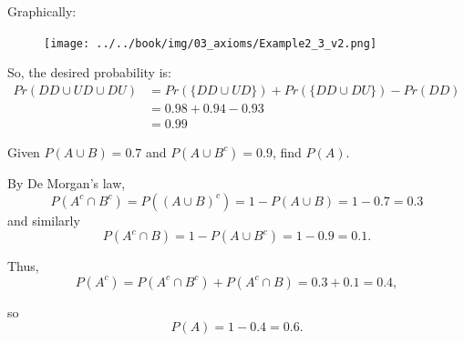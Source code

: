 \documentclass[notes=show,handout]{beamer}\usepackage[]{graphicx}\usepackage[]{color}
\begin{document}
\begin{frame}{\secname}
  \begin{example}
  \begin{footnotesize}
  Graphically:
  \begin{figure}[h!]
  \centering
  \texttt{[image: ../../book/img/03\_axioms/Example2\_3\_v2.png]}
  \end{figure}

  So, the desired probability is:
  \begin{align*}
    Pr(DD \cup UD \cup DU) &= Pr(\{DD \cup UD\}) + Pr(\{DD \cup DU\}) - Pr(DD) \\
    &= 0.98 + 0.94-0.93 \\
    &= 0.99
  \end{align*}
  \end{footnotesize}
  \end{example}
\end{frame}


\begin{frame}{\secname}
  \begin{example}
  \begin{small}
  Given  $P(A\cup B)=0.7$ and $P(A\cup {B}^c) = 0.9$, find $P(A)$.


  \vspace{0.2cm}


  By De Morgan's law,
  $$P(A^c \cap B^c) = P((A\cup B )^c) = 1 - P(A\cup B) = 1 - 0.7 = 0.3$$
  and similarly
  $$P(A^c \cap B) = 1 - P(A \cup B^c) = 1- 0.9 = 0.1.$$

  Thus,
  $$P(A^c)=P(A^c \cap B^c )+P(A^c \cap B)= 0.3+ 0.1= 0.4,$$

  so
  $$P(A)=1 - 0.4= 0.6.$$
  \end{small}
   \end{example}
\end{frame}
\end{document}
